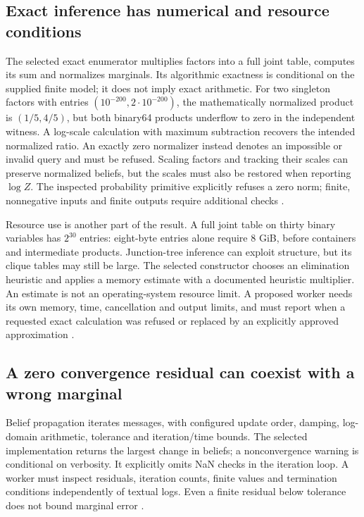 \subsection{Exact inference has numerical and resource conditions}
The selected exact enumerator multiplies factors into a full joint table,
computes its sum and normalizes marginals. Its algorithmic exactness is
conditional on the supplied finite model; it does not imply exact arithmetic.
For two singleton factors with entries $(10^{-200},2\cdot10^{-200})$, the
mathematically normalized product is $(1/5,4/5)$, but both binary64 products
underflow to zero in the independent witness. A log-scale calculation with
maximum subtraction recovers the intended normalized ratio. An exactly zero
normalizer instead denotes an impossible or invalid query and must be
refused. Scaling factors and tracking their scales can preserve normalized
beliefs, but the scales must also be restored when reporting $\log Z$.
The inspected probability primitive explicitly refuses a zero norm;
finite, nonnegative inputs and finite outputs require additional checks
\cite{exec24_libdai_source,exec24_libdai_choice}.

Resource use is another part of the result. A full joint table on thirty
binary variables has $2^{30}$ entries: eight-byte entries alone require
8 GiB, before containers and intermediate products. Junction-tree inference
can exploit structure, but its clique tables may still be large. The
selected constructor chooses an elimination heuristic and applies a memory
estimate with a documented heuristic multiplier. An estimate is not an
operating-system resource limit. A proposed worker needs its own memory,
time, cancellation and output limits, and must report when a requested
exact calculation was refused or replaced by an explicitly approved
approximation \cite{exec24_libdai_source,exec24_libdai_choice}.

\subsection{A zero convergence residual can coexist with a wrong marginal}
Belief propagation iterates messages, with configured update order, damping,
log-domain arithmetic, tolerance and iteration/time bounds. The selected
implementation returns the largest change in beliefs; a nonconvergence
warning is conditional on verbosity. It explicitly omits NaN checks in the
iteration loop. A worker must inspect residuals, iteration counts, finite
values and termination conditions independently of textual logs. Even a
finite residual below tolerance does not bound marginal error
\cite{exec24_libdai_source}.

